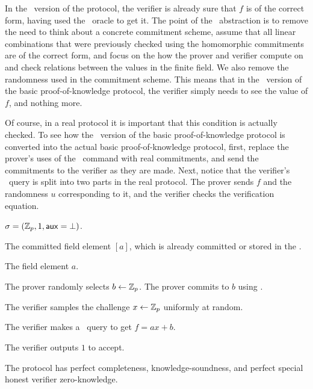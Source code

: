 In the \ILC\ version of the protocol, the verifier is already sure that $f$ is of the correct form, having used the \ILCopen\ oracle to get it. The point of the \ILC\ abstraction is to remove the need to think about a concrete commitment scheme, assume that all linear combinations that were previously checked using the homomorphic commitments are of the correct form, and focus on the how the prover and verifier compute on and check relations between the values in the finite field. We also remove the randomness used in the commitment scheme. This means that in the \ILC\ version of the basic proof-of-knowledge protocol, the verifier simply needs to see the value of $f$, and nothing more.

Of course, in a real protocol it is important that this condition is actually checked. To see how the \ILC\ version of the basic proof-of-knowledge protocol is converted into the actual basic proof-of-knowledge protocol, first, replace the prover's uses of the \ILCcommit\ command with real commitments, and send the commitments to the verifier as they are made. Next, notice that the verifier's \ILCopen\ query is split into two parts in the real protocol. The prover sends $f$ and the randomness $u$ corresponding to it, and the verifier checks the verification equation.

\begin{description} \label{prot:ILCschnorr}
\item[Common Reference String:] $\mathsf{\sigma}=(\mathbb{Z}_p,1,\mathsf{aux}=\bot)$.
\item[Instance:] The committed field element $[a]$, which is already committed or stored in the \ILC.
%
\item[Prover's witness:] The field element $a$.
%
\item[\ P:] The prover randomly selects $b \gets \mathbb{Z}_p$. The prover commits to $b$ using \ILCcommit.

\item[V:] The verifier samples the challenge $x \gets \mathbb{Z}_p$ uniformly at random.

The verifier makes a \ILCopen\ query to get $f = ax+b$.

The verifier outputs $1$ to accept.
\end{description}

\begin{lemma} \label{proof:ILCschnorr}
The protocol has perfect completeness, knowledge-soundness, and perfect special honest verifier zero-knowledge.
\end{lemma}

